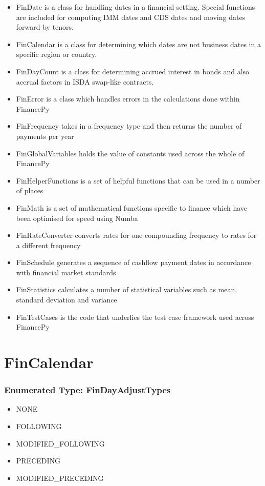 \documentclass[twoside,11pt]{book}
\begin{document}
\begin{itemize}
\item{ FinDate is a class for handling dates in a financial setting. Special functions are included for computing IMM dates and CDS dates and moving dates forward by tenors.
}
\item{ FinCalendar is a class for determining which dates are not business dates in a specific region or country.
}
\item{ FinDayCount is a class for determining accrued interest in bonds and also accrual factors in ISDA swap-like contracts.
}
\item{ FinError is a class which handles errors in the calculations done within FinancePy
}
\item{ FinFrequency takes in a frequency type and then returns the number of payments per year
}
\item{ FinGlobalVariables holds the value of constants used across the whole of FinancePy
}
\item{ FinHelperFunctions is a set of helpful functions that can be used in a number of places
}
\item{ FinMath is a set of mathematical functions specific to finance which have been optimised for speed using Numba
}
\item{ FinRateConverter converts rates for one compounding frequency to rates for a different frequency
}
\item{ FinSchedule generates a sequence of cashflow payment dates in accordance with financial market standards
}
\item{ FinStatistics calculates a number of statistical variables such as mean, standard deviation and variance
}
\item{ FinTestCases is the code that underlies the test case framework used across FinancePy
}
\end{itemize}


\newpage
\section{FinCalendar}

\subsubsection{Enumerated Type: FinDayAdjustTypes}
\begin{itemize}
\item{NONE}
\item{FOLLOWING}
\item{MODIFIED\_FOLLOWING}
\item{PRECEDING}
\item{MODIFIED\_PRECEDING}
\end{itemize}
\end{document}
